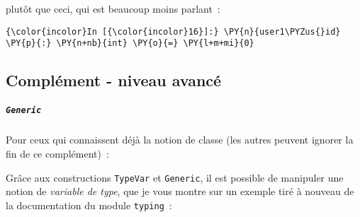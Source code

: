     plutôt que ceci, qui est beaucoup moins parlant~:

    \begin{Verbatim}[commandchars=\\\{\},frame=single,framerule=0.3mm,rulecolor=\color{cellframecolor}]
{\color{incolor}In [{\color{incolor}16}]:} \PY{n}{user1\PYZus{}id} \PY{p}{:} \PY{n+nb}{int} \PY{o}{=} \PY{l+m+mi}{0}
\end{Verbatim}


    \hypertarget{compluxe9ment---niveau-avancuxe9}{%
\subsection{Complément - niveau
avancé}\label{compluxe9ment---niveau-avancuxe9}}

    \hypertarget{generic}{%
\subparagraph{\texorpdfstring{\texttt{Generic}}{Generic}}\label{generic}}

    Pour ceux qui connaissent déjà la notion de classe (les autres peuvent
ignorer la fin de ce complément)~:

    Grâce aux constructions \texttt{TypeVar} et \texttt{Generic}, il est
possible de manipuler une notion de \emph{variable de type}, que je vous
montre sur un exemple tiré à nouveau de la documentation du module
\texttt{typing}~:

